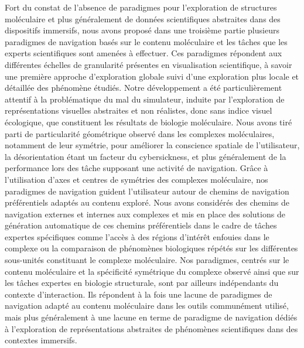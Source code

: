 Fort du constat de l'absence de paradigmes pour l'exploration de structures moléculaire et plus généralement de données scientifiques abstraites dans des dispositifs immersifs, nous avons proposé dans une troisième partie plusieurs paradigmes de navigation basés sur le contenu moléculaire et les tâches que les experts scientifiques sont amenées à effectuer. Ces paradigmes répondent aux différentes échelles de granularité présentes en visualisation scientifique, à savoir une première approche d'exploration globale suivi d'une exploration plus locale et détaillée des phénomène étudiés. Notre développement a été particulièrement attentif à la problématique du mal du simulateur, induite par l'exploration de représentations visuelles abstraites et non réalistes, donc sans indice visuel écologique, que constituent les résultats de biologie moléculaire. Nous avons tiré parti de particularité géométrique observé dans les complexes moléculaires, notamment de leur symétrie, pour améliorer la conscience spatiale de l'utilisateur, la désorientation étant un facteur du cybersickness, et plus généralement de la performance lors des tâche supposant une activité de navigation. Grâce à l'utilisation d'axes et centres de symétries des complexes moléculaire, nos paradigmes de navigation guident l'utilisateur autour de chemins de navigation préférentiels adaptés au contenu exploré. Nous avons considérés des chemins de navigation externes et internes aux complexes et mis en place des solutions de génération automatique de ces chemins préférentiels dans le cadre de tâches expertes spécifiques comme l'accès à des régions d'intérêt enfouies dans le complexe ou la comparaison de phénomènes biologiques répétés sur les différentes sous-unités constituant le complexe moléculaire.
Nos paradigmes, centrés sur le contenu moléculaire et la spécificité symétrique du complexe observé ainsi que sur les tâches expertes en biologie structurale, sont par ailleurs indépendants du contexte d'interaction. Ils répondent à la fois une lacune de paradigmes de navigation adapté au contenu moléculaire dans les outils communément utilisé, mais plus généralement à une lacune en terme de paradigme de navigation dédiés à l'exploration de représentations abstraites de phénomènes scientifiques  dans des contextes immersifs. 



